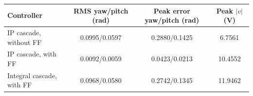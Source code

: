 \begin{center}
\begin{tabular}{lccc}
\hline
Controller & RMS yaw/pitch (rad) & Peak error yaw/pitch (rad) & Peak $|v|$ (V)\\\hline
IP cascade, without FF & 0.0995/0.0597 & 0.2880/0.1425 & 6.7561\\
IP cascade, with FF & 0.0092/0.0059 & 0.0423/0.0213 & 10.4552\\
Integral cascade, with FF & 0.0968/0.0580 & 0.2742/0.1345 & 11.9462\\
\hline
\end{tabular}
\end{center}

